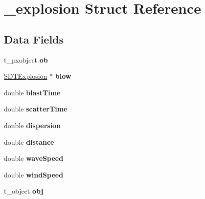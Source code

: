 \hypertarget{struct__explosion}{}\section{\+\_\+explosion Struct Reference}
\label{struct__explosion}
\subsection*{Data Fields}
\begin{DoxyCompactItemize}
\item 
\hypertarget{struct__explosion_a55b4380edb216f04a1c42b9095594963}{}t\+\_\+pxobject {\bfseries ob}\label{struct__explosion_a55b4380edb216f04a1c42b9095594963}

\item 
\hypertarget{struct__explosion_a0ed5e59446d83344514c63a512b9fa9b}{}\hyperlink{struct_s_d_t_explosion}{S\+D\+T\+Explosion} $\ast$ {\bfseries blow}\label{struct__explosion_a0ed5e59446d83344514c63a512b9fa9b}

\item 
\hypertarget{struct__explosion_aefd79dfa502522be24fed29577116e7f}{}double {\bfseries blast\+Time}\label{struct__explosion_aefd79dfa502522be24fed29577116e7f}

\item 
\hypertarget{struct__explosion_a66ccb13a3eba7343871e39e81b1eebc8}{}double {\bfseries scatter\+Time}\label{struct__explosion_a66ccb13a3eba7343871e39e81b1eebc8}

\item 
\hypertarget{struct__explosion_a8b4278d3872c62e3920e05de01c47230}{}double {\bfseries dispersion}\label{struct__explosion_a8b4278d3872c62e3920e05de01c47230}

\item 
\hypertarget{struct__explosion_a79b8e036dca6911e3295a47d99f21f43}{}double {\bfseries distance}\label{struct__explosion_a79b8e036dca6911e3295a47d99f21f43}

\item 
\hypertarget{struct__explosion_abb184b6a40b7cda371fae97a9ed873ca}{}double {\bfseries wave\+Speed}\label{struct__explosion_abb184b6a40b7cda371fae97a9ed873ca}

\item 
\hypertarget{struct__explosion_a1e61109612ce4b40408c03d7d23405c5}{}double {\bfseries wind\+Speed}\label{struct__explosion_a1e61109612ce4b40408c03d7d23405c5}

\item 
\hypertarget{struct__explosion_a21775ab6bc98b0961a6e9fd9d832e65b}{}t\+\_\+object {\bfseries obj}\label{struct__explosion_a21775ab6bc98b0961a6e9fd9d832e65b}


\end{DoxyCompactItemize}
